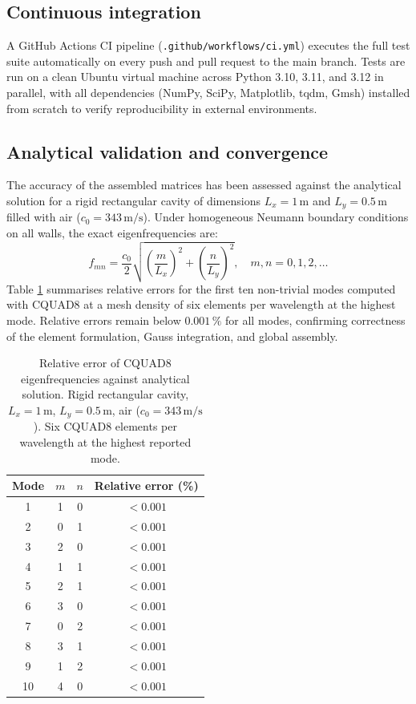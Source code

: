 \documentclass{jors}
\begin{document}
\subsection*{Continuous integration}

A GitHub Actions CI pipeline (\texttt{.github/workflows/ci.yml}) executes the full test suite automatically on every push and pull request to the main branch. Tests are run on a clean Ubuntu virtual machine across Python 3.10, 3.11, and 3.12 in parallel, with all dependencies (NumPy, SciPy, Matplotlib, tqdm, Gmsh) installed from scratch to verify reproducibility in external environments.

\subsection*{Analytical validation and convergence}

The accuracy of the assembled matrices has been assessed against the analytical solution for a rigid rectangular cavity of dimensions $L_x = 1\,\text{m}$ and $L_y = 0.5\,\text{m}$ filled with air ($c_0 = 343\,\text{m/s}$). Under homogeneous Neumann boundary conditions on all walls, the exact eigenfrequencies are:
\begin{equation}
    f_{mn} = \frac{c_0}{2} \sqrt{\left(\frac{m}{L_x}\right)^2 + \left(\frac{n}{L_y}\right)^2}, \quad m,n = 0, 1, 2, \ldots
\end{equation}
Table \ref{tab:validation} summarises relative errors for the first ten non-trivial modes computed with CQUAD8 at a mesh density of six elements per wavelength at the highest mode. Relative errors remain below $0.001\,\%$ for all modes, confirming correctness of the element formulation, Gauss integration, and global assembly.

\begin{table}[h]
\centering
\caption{Relative error of CQUAD8 eigenfrequencies against analytical solution. Rigid rectangular cavity, $L_x = 1\,\text{m}$, $L_y = 0.5\,\text{m}$, air ($c_0 = 343\,\text{m/s}$). Six CQUAD8 elements per wavelength at the highest reported mode.}
\label{tab:validation}
\begin{tabular}{@{}cccc@{}}
\toprule
Mode & $m$ & $n$ & Relative error (\%) \\
\midrule
1 & 1 & 0 & $<0.001$ \\
2 & 0 & 1 & $<0.001$ \\
3 & 2 & 0 & $<0.001$ \\
4 & 1 & 1 & $<0.001$ \\
5 & 2 & 1 & $<0.001$ \\
6 & 3 & 0 & $<0.001$ \\
7 & 0 & 2 & $<0.001$ \\
8 & 3 & 1 & $<0.001$ \\
9 & 1 & 2 & $<0.001$ \\
10 & 4 & 0 & $<0.001$ \\
\bottomrule
\end{tabular}
\end{table}
\end{document}
